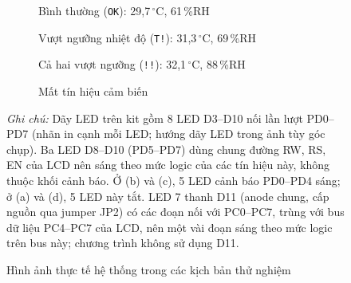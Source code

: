 \begin{figure}[H]
    \centering
    \begin{subfigure}[b]{0.48\textwidth}
        \centering
        \caption{Bình thường (\texttt{OK}): 29,7\,$^\circ$C, 61\,\%RH}
        \label{fig:actual-normal}
    \end{subfigure}
    \hfill
    \begin{subfigure}[b]{0.48\textwidth}
        \centering
        \caption{Vượt ngưỡng nhiệt độ (\texttt{T!}): 31,3\,$^\circ$C, 69\,\%RH}
        \label{fig:actual-overheat}
    \end{subfigure}

    \vspace{0.3cm}
    \begin{subfigure}[b]{0.48\textwidth}
        \centering
        \caption{Cả hai vượt ngưỡng (\texttt{!!}): 32,1\,$^\circ$C, 88\,\%RH}
        \label{fig:actual-both}
    \end{subfigure}
    \hfill
    \begin{subfigure}[b]{0.48\textwidth}
        \centering
        \caption{Mất tín hiệu cảm biến}
        \label{fig:actual-disconnect}
    \end{subfigure}
    \caption{Hình ảnh thực tế hệ thống trong các kịch bản thử nghiệm}
    \label{fig:actual-system}
    \vspace{0.1cm}
    {\small\textit{Ghi chú:} Dãy LED trên kit gồm 8 LED D3--D10 nối lần lượt PD0--PD7 (nhãn in cạnh mỗi LED; hướng dãy LED trong ảnh tùy góc chụp). Ba LED D8--D10 (PD5--PD7) dùng chung đường RW, RS, EN của LCD nên sáng theo mức logic của các tín hiệu này, không thuộc khối cảnh báo. Ở (b) và (c), 5 LED cảnh báo PD0--PD4 sáng; ở (a) và (d), 5 LED này tắt. LED 7 thanh D11 (anode chung, cấp nguồn qua jumper JP2) có các đoạn nối với PC0--PC7, trùng với bus dữ liệu PC4--PC7 của LCD, nên một vài đoạn sáng theo mức logic trên bus này; chương trình không sử dụng D11.\par}
\end{figure}

